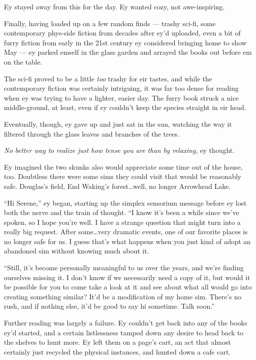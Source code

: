 Ey stayed away from this for the day. Ey wanted cozy, not awe-inspiring.

Finally, having loaded up on a few random finds — trashy sci-fi, some contemporary phys-side fiction from decades after ey'd uploaded, even a bit of furry fiction from early in the 21st century ey considered bringing home to show May — ey parked emself in the glass garden and arrayed the books out before em on the table.

The sci-fi proved to be a little \emph{too} trashy for eir tastes, and while the contemporary fiction was certainly intriguing, it was far too dense for reading when ey was trying to have a lighter, easier day. The furry book struck a nice middle-ground, at least, even if ey couldn't keep the species straight in eir head.

Eventually, though, ey gave up and just sat in the sun, watching the way it filtered through the glass leaves and branches of the trees.

\emph{No better way to realize just how tense you are than by relaxing,} ey thought.

Ey imagined the two skunks also would appreciate some time out of the house, too. Doubtless there were some sims they could visit that would be reasonably safe. Douglas's field, End Waking's forest\ldots well, no longer Arrowhead Lake.

``Hi Serene,'' ey began, starting up the simplex sensorium message before ey lost both the nerve and the train of thought. ``I know it's been a while since we've spoken, so I hope you're well. I have a strange question that might turn into a really big request. After some\ldots very dramatic events, one of our favorite places is no longer safe for us. I guess that's what happens when you just kind of adopt an abandoned sim without knowing much about it.

``Still, it's become personally meaningful to us over the years, and we're finding ourselves missing it. I don't know if we necessarily need a copy of it, but would it be possible for you to come take a look at it and see about what all would go into creating something similar? It'd be a modification of my home sim. There's no rush, and if nothing else, it'd be good to say hi sometime. Talk soon.''

Further reading was largely a failure. Ey couldn't get back into any of the books ey'd started, and a certain listlessness tamped down any desire to head back to the shelves to hunt more. Ey left them on a page's cart, an act that almost certainly just recycled the physical instances, and hunted down a cafe cart.

